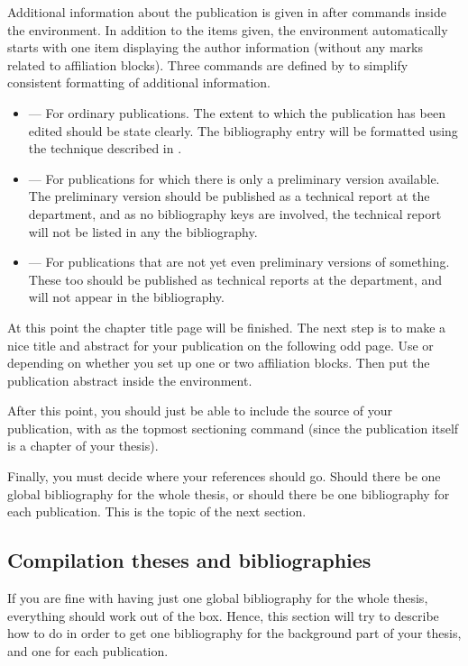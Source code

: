 Additional information about the publication is given in after  commands inside the  environment.  In addition to the items given, the environment automatically starts with one item displaying the author information (without any marks related to affiliation blocks).  Three commands are defined by \rtthesis to simplify consistent formatting of additional information.
\begin{itemize}
\item {} — For ordinary publications.  The extent to which the publication has been edited should be state clearly.  The bibliography entry will be formatted using the technique described in .
\item {} — For publications for which there is only a preliminary version available.  The preliminary version should be published as a technical report at the department, and as no bibliography keys are involved, the technical report will not be listed in any the bibliography.
\item {} — For publications that are not yet even preliminary versions of something.  These too should be published as technical reports at the department, and will not appear in the bibliography.
\end{itemize}

At this point the chapter title page will be finished.   The next step is to make a nice title and abstract for your publication on the following odd page.  Use  or  depending on whether you set up one or two affiliation blocks.  Then put the publication abstract inside the  environment.

After this point, you should just be able to include the source of your publication, with  as the topmost sectioning command (since the publication itself is a chapter of your thesis).

Finally, you must decide where your references should go.  Should there be one global bibliography for the whole thesis, or should there be one bibliography for each publication.  This is the topic of the next section.

\subsection{Compilation theses and bibliographies}
%
If you are fine with having just one global bibliography for the whole thesis, everything should work out of the box.  Hence, this section will try to describe how to do in order to get one bibliography for the background part of your thesis, and one for each publication.


